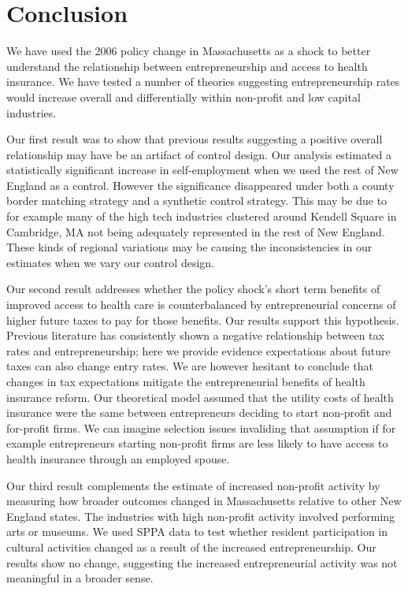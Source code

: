 \documentclass[12pt]{article}
\begin{document}
\section{Conclusion}
\label{sec:conclude}

We have used the 2006 policy change in Massachusetts as a shock to better understand the relationship between entrepreneurship and access to health insurance. We have tested a number of theories suggesting entrepreneurship rates would increase overall and differentially within non-profit and low capital industries. 

Our first result was to show that previous results suggesting a positive overall relationship may have be an artifact of control design. Our analysis estimated a statistically significant increase in self-employment when we used the rest of New England as a control. However the significance disappeared under both a county border matching strategy and a synthetic control strategy. This may be due to for example many of the high tech industries clustered around Kendell Square in Cambridge, MA not being adequately represented in the rest of New England. These kinds of regional variations may be causing the inconsistencies in our estimates when we vary our control design. 

Our second result addresses whether the policy shock's short term benefits of improved access to health care is counterbalanced by entrepreneurial concerns of higher future taxes to pay for those benefits. Our results support this hypothesis. Previous literature  has consistently shown a negative relationship between tax rates and entrepreneurship; here we provide evidence expectations about future taxes can also change entry rates. We are however hesitant to conclude that changes in tax expectations mitigate the entrepreneurial benefits of health insurance reform. Our theoretical model assumed that the utility costs of health insurance were the same between entrepreneurs deciding to start non-profit and for-profit firms. We can imagine selection issues invaliding that assumption if for example entrepreneurs starting non-profit firms are less likely to have access to health insurance through an employed spouse. 

Our third result complements the estimate of increased non-profit activity by measuring how broader outcomes changed in Massachusetts relative to other New England states. The industries with high non-profit activity involved performing arts or museums. We used SPPA data to test whether resident participation in cultural activities changed as a result of the increased entrepreneurship. Our results show no change, suggesting the increased entrepreneurial activity was not meaningful in a broader sense. 
\end{document}
